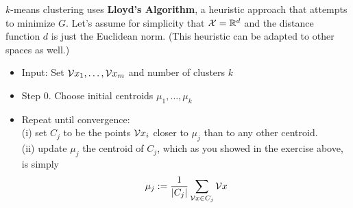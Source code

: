 $k$-means clustering uses {\bf Lloyd's Algorithm}, a heuristic approach that
attempts to 
minimize $G$. Let's assume for simplicity that $\mathcal{X}=\mathbb{R}^d$ and the distance
function $d$ is just the Euclidean norm. (This heuristic can be adapted to
other spaces as well.)
        \begin{itemize}
          \item Input: Set $\mathcal{V}{x}_1,\ldots,\mathcal{V}{x}_m$ and number of clusters $k$
          \item Step 0. Choose initial centroids $\mu_1,\ldots,\mu_k$
          \item Repeat until convergence: \\
            (i) set $C_j$ to be the points
            $\mathcal{V}{x}_i$ closer to $\mu_j$ than to any other centroid. \\(ii) update 
            $\mu_j$ the centroid of $C_j$, which as you showed in the exercise
            above, is simply 
            \[
              \mu_j := \frac{1}{|C_j|} \sum_{\mathcal{V}{x}\in C_j} \mathcal{V}{x}
            \]

        \end{itemize}

